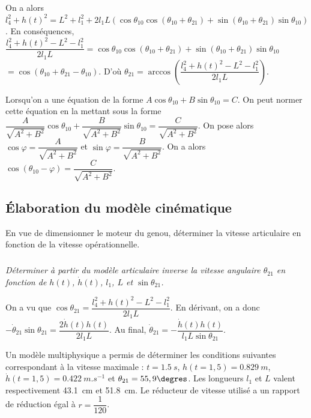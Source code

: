 \documentclass[10pt,fleqn]{article} %
\begin{document}
\begin{multicols}{2}
\begin{corrige}
On a alors 
$l_4 ^2 +h(t)^2= L^2 + l_1^2 + 2l_1L\left(\cos\theta_{10}\cos\left(\theta_{10}+\theta_{21}\right) +\sin\left(\theta_{10}+\theta_{21}\right) \sin\theta_{10}\right)$.
En conséquences, 
$\dfrac{l_4 ^2 +h(t)^2- L^2 - l_1^2}{2l_1L} = \cos\theta_{10}\cos\left(\theta_{10}+\theta_{21}\right) +\sin\left(\theta_{10}+\theta_{21}\right) \sin\theta_{10}$
$= \cos\left(\theta_{10}+\theta_{21}-\theta_{10}\right) $.
D'où $\theta_{21}=\arccos\left(\dfrac{l_4 ^2 +h(t)^2- L^2 - l_1^2}{2l_1L}  \right)$.
\end{corrige}


\else
\fi

\ifprof
\else
\begin{methode}
Lorsqu'on a une équation de la forme $A\cos\theta_{10}+B\sin\theta_{10}=C$. On peut normer cette équation en la mettant sous la forme $\dfrac{A}{\sqrt{A^2+B^2}}\cos\theta_{10}+\dfrac{B}{\sqrt{A^2+B^2}}\sin\theta_{10}=\dfrac{C}{\sqrt{A^2+B^2}}$.
On pose alors $\cos\varphi = \dfrac{A}{\sqrt{A^2+B^2}}$ et $\sin\varphi=\dfrac{B}{\sqrt{A^2+B^2}}$. On a alors $\cos\left( \theta_{10} - \varphi \right)=\dfrac{C}{\sqrt{A^2+B^2}}$.
\end{methode}
\fi

\subsection*{Élaboration du modèle cinématique}
\begin{obj}
En vue de dimensionner le moteur du genou, déterminer la vitesse articulaire en fonction de la  vitesse opérationnelle.
\end{obj}

\subparagraph{}\textit{Déterminer à partir du modèle articulaire inverse la vitesse angulaire 
$\theta_{21}$ en fonction de $h(t)$, $\dot{h}(t)$, $l_1$, $L$ et $\sin\theta_{21}$.}
\ifprof
\begin{corrige}
On a vu que $\cos\theta_{21}=\dfrac{l_4 ^2 +h(t)^2- L^2 - l_1^2}{2l_1L}  $.
En dérivant, on a donc $- \dot{\theta}_{21} \sin\theta_{21}=\dfrac{2\dot{h}(t)h(t)}{2l_1L}$.
Au final,  $\dot{\theta}_{21} =-\dfrac{\dot{h}(t)h(t)}{l_1L\sin\theta_{21}}$.
\end{corrige}
\else
\fi

\ifprof
\else
Un modèle multiphysique a permis de déterminer les conditions suivantes correspondant à la vitesse maximale : $t=\SI{1,5}{s}$, $h(t=1,5)=\SI{0,829}{m}$, $\dot{h}(t=1,5)=\SI{0,422}{m.s^{-1}}$ et $\theta_{21} = 55,9\degres$. Les longueurs $l_1$ et $L$ valent
respectivement \SI{43,1}{cm} et \SI{51,8}{cm}. Le réducteur de vitesse utilisé a un rapport de réduction égal à $r=\dfrac{1}{120}$.
\fi


\end{multicols}
\end{document}
